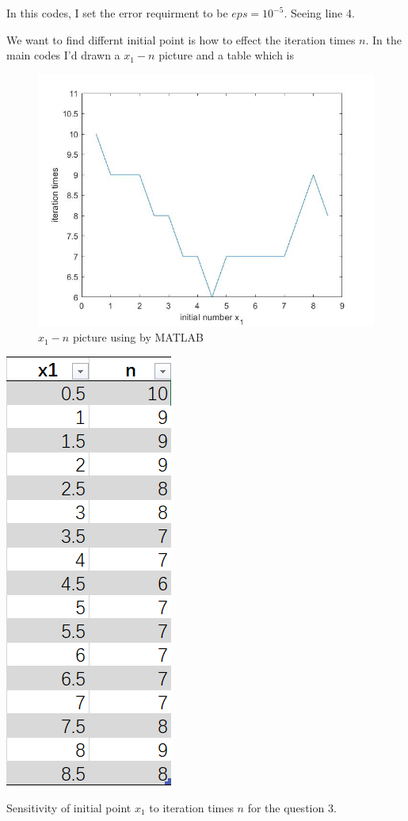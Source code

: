 \documentclass{report}
\begin{document}
In this codes, I set the error requirment to be $eps =10^{-5}$. Seeing line 4.

\newpage
\par We want to find differnt initial point is how to effect the iteration times $n$. 
In the main codes I'd drawn a $x_1-n$ picture and a table which is 

\begin{figure}[htbp]
    \centering
    \includegraphics[scale=0.4]{figs/3_3.jpg}
    \caption{$x_1-n$ picture using by MATLAB}
\end{figure}

\begin{table}[htbp]
    \centering
    \includegraphics[scale=0.5]{figs/3_4.jpg}
    \caption{Sensitivity of initial point $x_1$ to iteration times $n$ for the question 3.}
\end{table}
\end{document}
